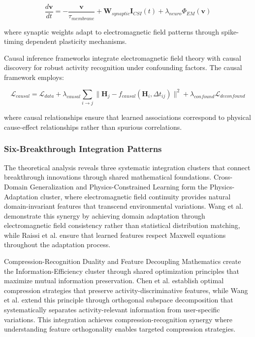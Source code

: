 \documentclass[journal]{IEEEtran}
\begin{document}
\begin{equation}
\frac{d\mathbf{v}}{dt} = -\frac{\mathbf{v}}{\tau_{membrane}} + \mathbf{W}_{synaptic} \mathbf{I}_{CSI}(t) + \lambda_{neuro} \Phi_{EM}(\mathbf{v})
\label{eq:neuromorphic_dynamics}
\end{equation}

where synaptic weights adapt to electromagnetic field patterns through spike-timing dependent plasticity mechanisms.

Causal inference frameworks integrate electromagnetic field theory with causal discovery for robust activity recognition under confounding factors. The causal framework employs:

\begin{equation}
\mathcal{L}_{causal} = \mathcal{L}_{data} + \lambda_{causal} \sum_{i \rightarrow j} \|\mathbf{H}_j - f_{causal}(\mathbf{H}_i, \Delta t_{ij})\|^2 + \lambda_{confound} \mathcal{L}_{deconfound}
\label{eq:causal_framework}
\end{equation}

where causal relationships ensure that learned associations correspond to physical cause-effect relationships rather than spurious correlations.

\subsubsection{Six-Breakthrough Integration Patterns}

The theoretical analysis reveals three systematic integration clusters that connect breakthrough innovations through shared mathematical foundations. Cross-Domain Generalization and Physics-Constrained Learning form the Physics-Adaptation cluster, where electromagnetic field continuity provides natural domain-invariant features that transcend environmental variations. Wang et al. \cite{wang2022airfi} demonstrate this synergy by achieving domain adaptation through electromagnetic field consistency rather than statistical distribution matching, while Raissi et al. \cite{raissi2019physics} ensure that learned features respect Maxwell equations throughout the adaptation process.

Compression-Recognition Duality and Feature Decoupling Mathematics create the Information-Efficiency cluster through shared optimization principles that maximize mutual information preservation. Chen et al. \cite{chen2024efficientfi} establish optimal compression strategies that preserve activity-discriminative features, while Wang et al. \cite{wang2024feature} extend this principle through orthogonal subspace decomposition that systematically separates activity-relevant information from user-specific variations. This integration achieves compression-recognition synergy where understanding feature orthogonality enables targeted compression strategies.
\end{document}
